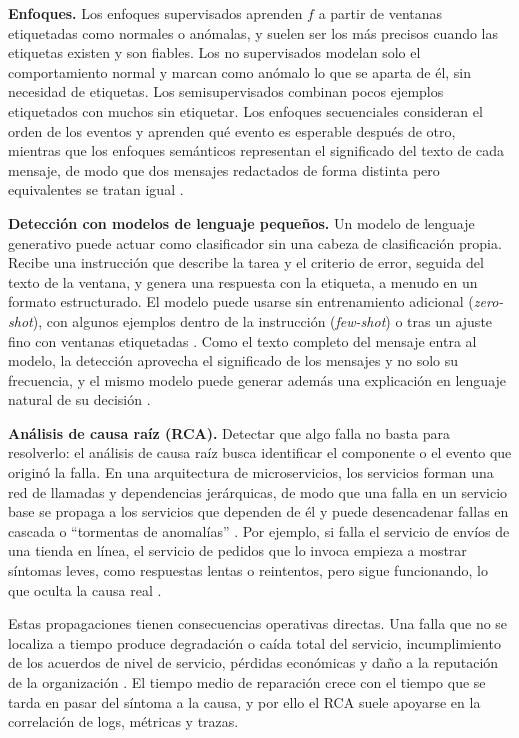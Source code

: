 \textbf{Enfoques.} Los enfoques supervisados aprenden $f$ a partir de ventanas etiquetadas como normales o anómalas, y suelen ser los más precisos cuando las etiquetas existen y son fiables. Los no supervisados modelan solo el comportamiento normal y marcan como anómalo lo que se aparta de él, sin necesidad de etiquetas. Los semisupervisados combinan pocos ejemplos etiquetados con muchos sin etiquetar. Los enfoques secuenciales consideran el orden de los eventos y aprenden qué evento es esperable después de otro, mientras que los enfoques semánticos representan el significado del texto de cada mensaje, de modo que dos mensajes redactados de forma distinta pero equivalentes se tratan igual \cite{jiang2021_aiops}.

\textbf{Detección con modelos de lenguaje pequeños.} Un modelo de lenguaje generativo puede actuar como clasificador sin una cabeza de clasificación propia. Recibe una instrucción que describe la tarea y el criterio de error, seguida del texto de la ventana, y genera una respuesta con la etiqueta, a menudo en un formato estructurado. El modelo puede usarse sin entrenamiento adicional (\textit{zero-shot}), con algunos ejemplos dentro de la instrucción (\textit{few-shot}) o tras un ajuste fino con ventanas etiquetadas \cite{liu2024_logprompt}. Como el texto completo del mensaje entra al modelo, la detección aprovecha el significado de los mensajes y no solo su frecuencia, y el mismo modelo puede generar además una explicación en lenguaje natural de su decisión \cite{lim2025_logadreft}.

\textbf{Análisis de causa raíz (RCA).} Detectar que algo falla no basta para resolverlo: el análisis de causa raíz busca identificar el componente o el evento que originó la falla. En una arquitectura de microservicios, los servicios forman una red de llamadas y dependencias jerárquicas, de modo que una falla en un servicio base se propaga a los servicios que dependen de él y puede desencadenar fallas en cascada o ``tormentas de anomalías'' \cite{wang2024_rca}. Por ejemplo, si falla el servicio de envíos de una tienda en línea, el servicio de pedidos que lo invoca empieza a mostrar síntomas leves, como respuestas lentas o reintentos, pero sigue funcionando, lo que oculta la causa real \cite{pedroso2025_maia}.

Estas propagaciones tienen consecuencias operativas directas. Una falla que no se localiza a tiempo produce degradación o caída total del servicio, incumplimiento de los acuerdos de nivel de servicio, pérdidas económicas y daño a la reputación de la organización \cite{wang2024_rca}. El tiempo medio de reparación crece con el tiempo que se tarda en pasar del síntoma a la causa, y por ello el RCA suele apoyarse en la correlación de logs, métricas y trazas.

